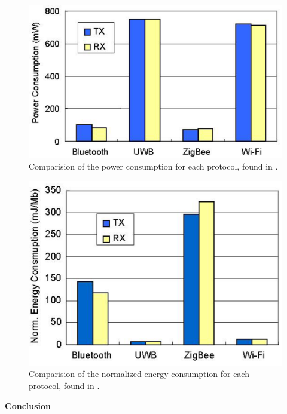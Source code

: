 \documentclass[10pt,a4paper]{article}
\begin{document}
\begin{figure}[H]
   \centering
   \includegraphics[width=1\textwidth]{images/protocolenergy.png}
   \caption{Comparision of the power consumption for each protocol, found in \cite{comparitivestudywirelessprotocols}.}
   \label{fig:protocolenergy}
\end{figure}

\begin{figure}[H]
   \centering
   \includegraphics[width=1\textwidth]{images/protocolenergynormalized.png}
   \caption{Comparision of the normalized energy consumption for each protocol, found in \cite{comparitivestudywirelessprotocols}.}
   \label{fig:protocolenergynormalized}
\end{figure}


\textbf{Conclusion}\\
\end{document}
